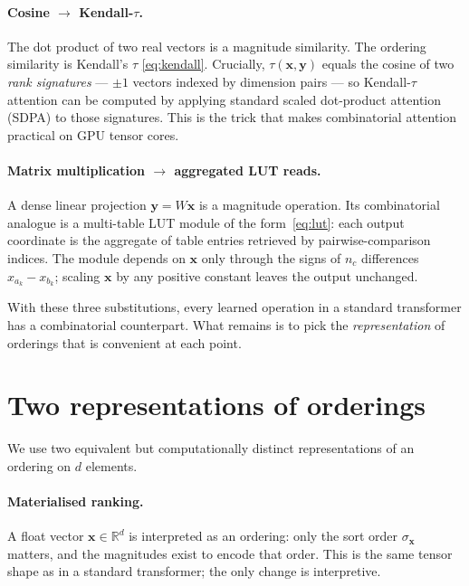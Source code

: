 \documentclass[11pt]{article}
\begin{document}
\paragraph{Cosine $\to$ Kendall-$\tau$.}
The dot product of two real vectors is a magnitude similarity.
The ordering similarity is Kendall's $\tau$ \eqref{eq:kendall}.
Crucially, $\tau(\mathbf{x}, \mathbf{y})$ equals the cosine of two \emph{rank signatures} --- $\pm 1$ vectors indexed by dimension pairs --- so Kendall-$\tau$ attention can be computed by applying standard scaled dot-product attention (SDPA) to those signatures.
This is the trick that makes combinatorial attention practical on GPU tensor cores.

\paragraph{Matrix multiplication $\to$ aggregated LUT reads.}
A dense linear projection $\mathbf{y} = W\mathbf{x}$ is a magnitude operation.
Its combinatorial analogue is a multi-table LUT module of the form~\eqref{eq:lut}: each output coordinate is the aggregate of table entries retrieved by pairwise-comparison indices.
The module depends on $\mathbf{x}$ only through the signs of $n_c$ differences $x_{a_k} - x_{b_k}$; scaling $\mathbf{x}$ by any positive constant leaves the output unchanged.

With these three substitutions, every learned operation in a standard transformer has a combinatorial counterpart.
What remains is to pick the \emph{representation} of orderings that is convenient at each point.


\section{Two representations of orderings}
\label{sec:representations}

We use two equivalent but computationally distinct representations of an ordering on $d$ elements.

\paragraph{Materialised ranking.}
A float vector $\mathbf{x} \in \mathbb{R}^d$ is interpreted as an ordering: only the sort order $\sigma_\mathbf{x}$ matters, and the magnitudes exist to encode that order.
This is the same tensor shape as in a standard transformer; the only change is interpretive.
\end{document}
